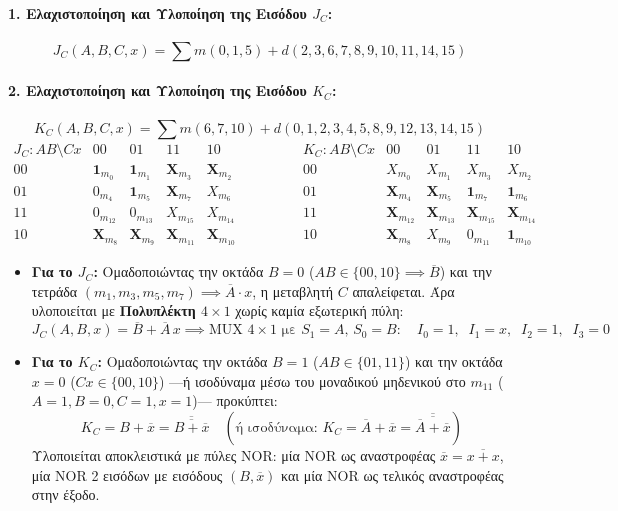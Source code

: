 \documentclass[11pt, a4paper]{article}
\begin{document}
\paragraph{1. Ελαχιστοποίηση και Υλοποίηση της Εισόδου $J_C$:}
\[
J_C(A, B, C, x) = \sum m(0, 1, 5) + d(2, 3, 6, 7, 8, 9, 10, 11, 14, 15)
\]
\paragraph{2. Ελαχιστοποίηση και Υλοποίηση της Εισόδου $K_C$:}
\[
K_C(A, B, C, x) = \sum m(6, 7, 10) + d(0, 1, 2, 3, 4, 5, 8, 9, 12, 13, 14, 15)
\]
\[
\begin{array}{c|cccc}
J_C: AB \setminus Cx & 00 & 01 & 11 & 10 \\
\hline
00 & \mathbf{1}_{m_0} & \mathbf{1}_{m_1} & \mathbf{X}_{m_3} & \mathbf{X}_{m_2} \\
01 & 0_{m_4} & \mathbf{1}_{m_5} & \mathbf{X}_{m_7} & X_{m_6} \\
11 & 0_{m_{12}} & 0_{m_{13}} & X_{m_{15}} & X_{m_{14}} \\
10 & \mathbf{X}_{m_8} & \mathbf{X}_{m_9} & \mathbf{X}_{m_{11}} & \mathbf{X}_{m_{10}}
\end{array}
\qquad\qquad
\begin{array}{c|cccc}
K_C: AB \setminus Cx & 00 & 01 & 11 & 10 \\
\hline
00 & X_{m_0} & X_{m_1} & X_{m_3} & X_{m_2} \\
01 & \mathbf{X}_{m_4} & \mathbf{X}_{m_5} & \mathbf{1}_{m_7} & \mathbf{1}_{m_6} \\
11 & \mathbf{X}_{m_{12}} & \mathbf{X}_{m_{13}} & \mathbf{X}_{m_{15}} & \mathbf{X}_{m_{14}} \\
10 & \mathbf{X}_{m_8} & X_{m_9} & 0_{m_{11}} & \mathbf{1}_{m_{10}}
\end{array}
\]

\begin{itemize}[leftmargin=1.5em]
    \item \textbf{Για το $J_C$:} Ομαδοποιώντας την οκτάδα $B=0$ ($AB \in \{00, 10\} \implies \overline{B}$) και την τετράδα $(m_1, m_3, m_5, m_7) \implies \overline{A} \cdot x$, η μεταβλητή $C$ απαλείφεται. Άρα υλοποιείται με \textbf{Πολυπλέκτη $4\times 1$} χωρίς καμία εξωτερική πύλη:
    \[
    \boxed{J_C(A, B, x) = \overline{B} + \overline{A}\,x \implies \text{MUX } 4\times 1 \text{ με } S_1 = A, \, S_0 = B: \quad I_0 = 1, \;\; I_1 = x, \;\; I_2 = 1, \;\; I_3 = 0}
    \]
    \item \textbf{Για το $K_C$:} Ομαδοποιώντας την οκτάδα $B=1$ ($AB \in \{01, 11\}$) και την οκτάδα $x=0$ ($Cx \in \{00, 10\}$) ---ή ισοδύναμα μέσω του μοναδικού μηδενικού στο $m_{11}$ ($A=1, B=0, C=1, x=1$)--- προκύπτει:
    \[
    \boxed{K_C = B + \overline{x} = \overline{\overline{B + \overline{x}}}} \quad \left(\text{ή ισοδύναμα: } \boxed{K_C = \overline{A} + \overline{x} = \overline{\overline{\overline{A} + \overline{x}}}}\right)
    \]
    Υλοποιείται αποκλειστικά με πύλες NOR: μία NOR ως αναστροφέας $\overline{x} = \overline{x+x}$, μία NOR 2 εισόδων με εισόδους $(B, \overline{x})$ και μία NOR ως τελικός αναστροφέας στην έξοδο.
\end{itemize}
\end{document}
